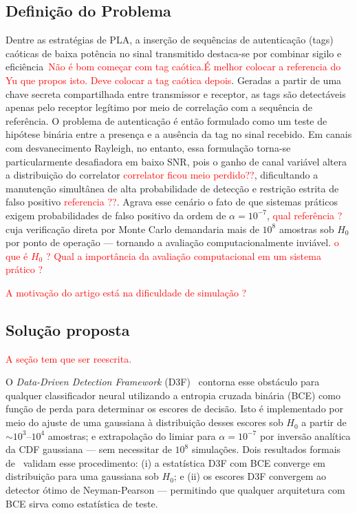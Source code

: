 \documentclass{sbrt}
\newcommand{\rred}[1]{\textcolor{red}{#1}}
\begin{document}
 \subsection{Definição do Problema}
 
 Dentre as estratégias de PLA, a inserção de sequências de autenticação (tags) caóticas de baixa potência no sinal transmitido destaca-se por combinar sigilo e eficiência~\cite{ref_joao}\rred{Não é bom começar com tag caótica.É melhor colocar a referencia do Yu que propos isto. Deve colocar a tag caótica depois}. Geradas a partir de uma chave secreta compartilhada entre transmissor e receptor, as tags são detectáveis apenas pelo receptor legítimo por meio de correlação com a sequência de referência. O problema de autenticação é então formulado como um teste de hipótese binária entre a presença e a ausência da tag no sinal recebido. Em canais com desvanecimento Rayleigh, no entanto, essa formulação torna-se particularmente desafiadora em baixo SNR, pois o ganho de canal variável altera a distribuição do correlator \rred{correlator ficou meio perdido??}, dificultando a manutenção simultânea de alta probabilidade de detecção e restrição estrita de falso positivo \rred{referencia ??}. Agrava esse cenário o fato de que sistemas práticos exigem probabilidades de falso positivo da ordem de $\alpha = 10^{-7}$, \rred{qual referência ?} cuja verificação direta por Monte Carlo demandaria mais de $10^8$ amostras sob $H_0$ por ponto de operação — tornando a avaliação computacionalmente inviável. \rred{o que é $H_0$ ?} \rred{Qual a importância da avaliação computacional em um sistema prático  ?  }

\rred{ A motivação do artigo está na dificuldade de simulação ? }

\subsection{Solução proposta}

\rred{A seção tem que ser reescrita. }

O \textit{Data-Driven Detection Framework} (D3F)~\cite{ref_braca} contorna esse obstáculo para qualquer classificador neural utilizando a entropia cruzada binária (BCE) como função de perda para determinar os escores de decisão. Isto é implementado por meio do ajuste de uma gaussiana à distribuição desses escores sob $H_0$ a partir de $\sim\!10^3$--$10^4$ amostras; e extrapolação do limiar para $\alpha = 10^{-7}$ por inversão analítica da CDF gaussiana — sem necessitar de $10^8$ simulações. Dois resultados formais de~\cite{ref_braca} validam esse procedimento: (i) a estatística D3F com BCE converge em distribuição para uma gaussiana sob $H_0$; e (ii) os escores D3F convergem ao detector ótimo de Neyman-Pearson — permitindo que qualquer arquitetura com BCE sirva como estatística de teste.
\end{document}
